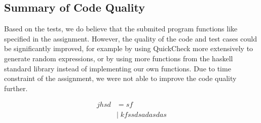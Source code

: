 \documentclass[11pt, a4paper]{article}
\begin{document}
\subsection{Summary of Code Quality}
Based on the tests, we do believe that the submited program functions like specified in the assignment. However, the quality of the code and test cases could be significantly improved, for example by using QuickCheck more extensively to generate random expressions, or by using more functions from the haskell standard library instead of implementing our own functions. Due to time constraint of the assignment, we were not able to improve the code quality further.

\begin{align*}
	jhsd &= sf \\
	&| \; kfssdsadasdas
\end{align*}
\end{document}
